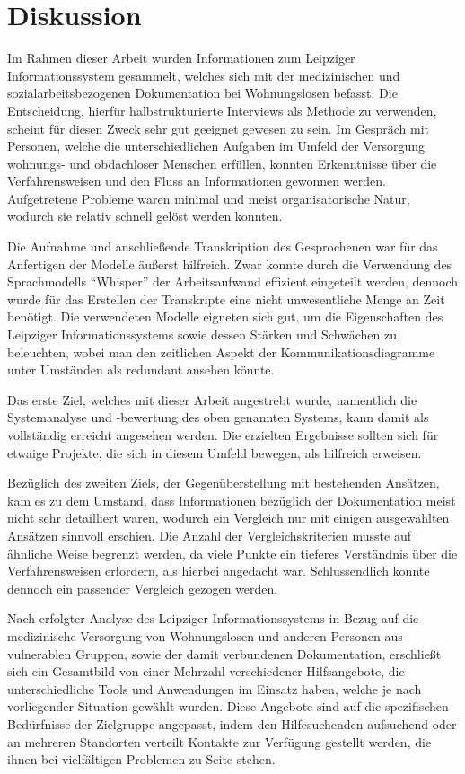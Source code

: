 \chapter{Diskussion}\label{ch:discussion}

Im Rahmen dieser Arbeit wurden Informationen zum Leipziger Informationssystem gesammelt, welches sich mit der medizinischen und sozialarbeitsbezogenen Dokumentation bei Wohnungslosen befasst. Die Entscheidung, hierfür halbstrukturierte Interviews als Methode zu verwenden, scheint für diesen Zweck sehr gut geeignet gewesen zu sein. Im Gespräch mit Personen, welche die unterschiedlichen Aufgaben im Umfeld der Versorgung wohnungs- und obdachloser Menschen erfüllen, konnten Erkenntnisse über die Verfahrensweisen und den Fluss an Informationen gewonnen werden. Aufgetretene Probleme waren minimal und meist organisatorische Natur, wodurch sie relativ schnell gelöst werden konnten.

Die Aufnahme und anschließende Transkription des Gesprochenen war für das Anfertigen der Modelle äußerst hilfreich. Zwar konnte durch die Verwendung des Sprachmodells \enquote{Whisper} der Arbeitsaufwand effizient eingeteilt werden, dennoch wurde für das Erstellen der Transkripte eine nicht unwesentliche Menge an Zeit benötigt. Die verwendeten Modelle eigneten sich gut, um die Eigenschaften des Leipziger Informationssystems sowie dessen Stärken und Schwächen zu beleuchten, wobei man den zeitlichen Aspekt der Kommunikationsdiagramme unter Umständen als redundant ansehen könnte.

Das erste Ziel, welches mit dieser Arbeit angestrebt wurde, namentlich die Systemanalyse und -bewertung des oben genannten Systems, kann damit als vollständig erreicht angesehen werden. Die erzielten Ergebnisse sollten sich für etwaige Projekte, die sich in diesem Umfeld bewegen, als hilfreich erweisen.

Bezüglich des zweiten Ziels, der Gegenüberstellung mit bestehenden Ansätzen, kam es zu dem Umstand, dass Informationen bezüglich der Dokumentation meist nicht sehr detailliert waren, wodurch ein Vergleich nur mit einigen ausgewählten Ansätzen sinnvoll erschien. Die Anzahl der Vergleichskriterien musste auf ähnliche Weise begrenzt werden, da viele Punkte ein tieferes Verständnis über die Verfahrensweisen erfordern, als hierbei angedacht war. Schlussendlich konnte dennoch ein passender Vergleich gezogen werden.

Nach erfolgter Analyse des Leipziger Informationssystems in Bezug auf die medizinische Versorgung von Wohnungslosen und anderen Personen aus vulnerablen Gruppen, sowie der damit verbundenen Dokumentation, erschließt sich ein Gesamtbild von einer Mehrzahl verschiedener Hilfsangebote, die unterschiedliche Tools und Anwendungen im Einsatz haben, welche je nach vorliegender Situation gewählt wurden. Diese Angebote sind auf die spezifischen Bedürfnisse der Zielgruppe angepasst, indem den Hilfesuchenden aufsuchend oder an mehreren Standorten verteilt Kontakte zur Verfügung gestellt werden, die ihnen bei vielfältigen Problemen zu Seite stehen.

